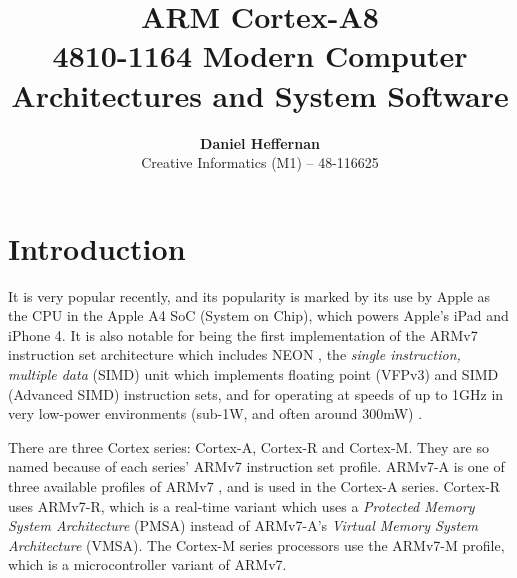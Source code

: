 \documentclass[oneside,a4paper]{report}
\title{ \textbf{ARM Cortex-A8} \\ \large{4810-1164 Modern Computer Architectures and System Software}}
\author{ \textbf{Daniel Heffernan} \\ Creative Informatics (M1) -- 48-116625 }
\begin{document}
\ifpdf
{}
\else
{}
\fi

\maketitle

\chapter{Introduction}

It is very popular recently, and its popularity is marked by its use by Apple as the CPU in the Apple A4 SoC (System on Chip), which powers Apple's iPad and iPhone 4. It is also notable for being the first implementation of the ARMv7 instruction set architecture which includes NEON \cite{Gris}, the \emph{single instruction, multiple data} (SIMD) unit which implements floating point (VFPv3) and SIMD (Advanced SIMD) instruction sets, and for operating at speeds of up to 1GHz in very low-power environments (sub-1W, and often around 300mW) \cite{Williamson}.

There are three Cortex series: Cortex-A, Cortex-R and Cortex-M. They are so named because of each series' ARMv7 instruction set profile. ARMv7-A is one of three available profiles of ARMv7 \cite[p. A1-4]{ARMRef}, and is used in the Cortex-A series. Cortex-R uses ARMv7-R, which is a real-time variant which uses a \emph{Protected Memory System Architecture} (PMSA) instead of ARMv7-A's \emph{Virtual Memory System Architecture} (VMSA). The Cortex-M series processors use the ARMv7-M profile, which is a microcontroller variant of ARMv7.
\end{document}
